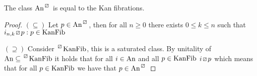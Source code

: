 \begin{prop}
    The class $\An^{\lift{}}$ is equal to the Kan fibrations.
\end{prop}

\begin{proof}
    $(\subseteq)$ Let $p \in \An^{\lift{}}$, then for all $n\geq 0$ there exists $0 \leq k \leq  n$ such that $i_{n,k} \lift{} p: p \in \KanFib$

    $(\supseteq)$ Consider $\prescript{\lift{}}{}{\KanFib}$, this is a saturated class. 
    By unitality of $\An \subseteq \prescript{\lift{}}{}{\KanFib}$ it holds that for all $i \in  \operatorname{An}$ and all $p \in \operatorname{KanFib}$ $i\lift{}p $ which means that for all $p \in \operatorname{KanFib}$ we have that $p \in \An^{\lift{}}$
\end{proof}
    